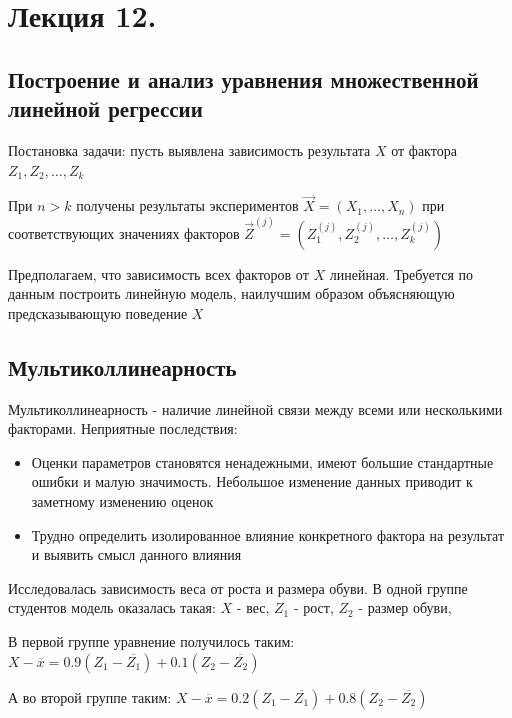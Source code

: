 \documentclass[12pt]{article}
\begin{document}





\section{Лекция 12.}

\subsection{Построение и анализ уравнения множественной линейной регрессии}

Постановка задачи: пусть выявлена зависимость результата $X$ от фактора $Z_1, Z_2, \dots, Z_k$

При $n > k$ получены результаты экспериментов $\vec X = (X_1, \dots, X_n)$ при соответствующих значениях факторов $\vec Z^{(j)} = (Z^{(j)}_1, Z^{(j)}_2, \dots, Z^{(j)}_k)$

Предполагаем, что зависимость всех факторов от $X$ линейная. Требуется по данным построить линейную модель, наилучшим образом объясняющую предсказывающую поведение $X$

\subsection{Мультиколлинеарность}

\hypertarget{multicollinearity}{}

\Def Мультиколлинеарность - наличие линейной связи между всеми или несколькими факторами. Неприятные последствия:

\begin{itemize}
    \item Оценки параметров становятся ненадежными, имеют большие стандартные ошибки и малую значимость.
    Небольшое изменение данных приводит к заметному изменению оценок
    \item Трудно определить изолированное влияние конкретного фактора на результат и выявить смысл данного влияния
\end{itemize}

\Ex Исследовалась зависимость веса от роста и размера обуви. В одной группе студентов модель оказалась такая: 
$X$ - вес, $Z_1$ - рост, $Z_2$ - размер обуви, 

В первой группе уравнение получилось таким: $X - \overline{x} = 0.9(Z_1 - \overline{Z_1}) + 0.1(Z_2 - \overline{Z_2})$

А во второй группе таким: $X - \overline{x} = 0.2(Z_1 - \overline{Z_1}) + 0.8(Z_2 - \overline{Z_2})$
\end{document}
